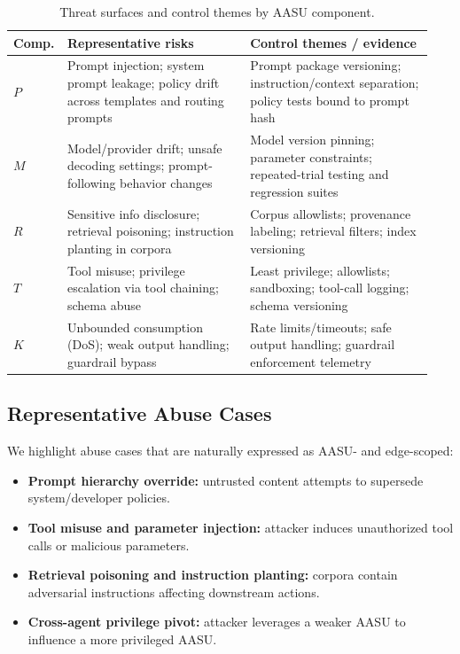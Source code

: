 \documentclass[11pt]{article}
\newcommand{\AASU}{\textsc{AASU}}
\begin{document}
\begin{table}[t]
  \centering
  \small
  \begin{tabular}{@{}p{0.08\linewidth}p{0.43\linewidth}p{0.43\linewidth}@{}}
    \toprule
    \textbf{Comp.} & \textbf{Representative risks} & \textbf{Control themes / evidence} \\
    \midrule
    $P$ &
    Prompt injection; system prompt leakage; policy drift across templates and routing prompts &
    Prompt package versioning; instruction/context separation; policy tests bound to prompt hash \\
    $M$ &
    Model/provider drift; unsafe decoding settings; prompt-following behavior changes &
    Model version pinning; parameter constraints; repeated-trial testing and regression suites \\
    $R$ &
    Sensitive info disclosure; retrieval poisoning; instruction planting in corpora &
    Corpus allowlists; provenance labeling; retrieval filters; index versioning \\
    $T$ &
    Tool misuse; privilege escalation via tool chaining; schema abuse &
    Least privilege; allowlists; sandboxing; tool-call logging; schema versioning \\
    $K$ &
    Unbounded consumption (DoS); weak output handling; guardrail bypass &
    Rate limits/timeouts; safe output handling; guardrail enforcement telemetry \\
    \bottomrule
  \end{tabular}
  \caption{Threat surfaces and control themes by \AASU{} component.}
  \label{tab:components}
\end{table}

\subsection{Representative Abuse Cases}
We highlight abuse cases that are naturally expressed as \AASU- and edge-scoped:
\begin{itemize}[leftmargin=*,itemsep=2pt]
  \item \textbf{Prompt hierarchy override:} untrusted content attempts to supersede system/developer policies.
  \item \textbf{Tool misuse and parameter injection:} attacker induces unauthorized tool calls or malicious parameters.
  \item \textbf{Retrieval poisoning and instruction planting:} corpora contain adversarial instructions affecting downstream actions.
  \item \textbf{Cross-agent privilege pivot:} attacker leverages a weaker \AASU{} to influence a more privileged \AASU{}.
\end{itemize}
\end{document}
